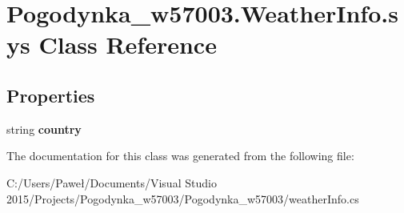 \hypertarget{class_pogodynka__w57003_1_1_weather_info_1_1sys}{}\section{Pogodynka\+\_\+w57003.\+Weather\+Info.\+sys Class Reference}
\label{class_pogodynka__w57003_1_1_weather_info_1_1sys}
\subsection*{Properties}
\begin{DoxyCompactItemize}
\item 
\mbox{\label{class_pogodynka__w57003_1_1_weather_info_1_1sys_a021e9a76576bbccd81e1fd325ac2d7a5}} 
string {\bfseries country}
\end{DoxyCompactItemize}


The documentation for this class was generated from the following file\+:\begin{DoxyCompactItemize}
\item 
C\+:/\+Users/\+Paweł/\+Documents/\+Visual Studio 2015/\+Projects/\+Pogodynka\+\_\+w57003/\+Pogodynka\+\_\+w57003/weather\+Info.\+cs\end{DoxyCompactItemize}
